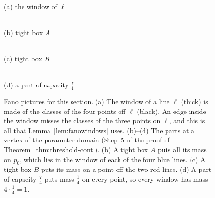 \documentclass[11pt]{amsart}
\theoremstyle{definition}
\theoremstyle{remark}
\newcommand{\fanopts}{%
  \coordinate (P1) at (0,0); \coordinate (P2) at (4,0); \coordinate (P3) at (2,3.464);
  \coordinate (P4) at (2,0); \coordinate (P5) at (3,1.732); \coordinate (P6) at (1,1.732); \coordinate (P7) at (2,1.155);}
\newcommand{\fanolines}[1]{%
  \draw[#1] (P1)--(P2)--(P3)--cycle; \draw[#1] (P1)--(P5); \draw[#1] (P2)--(P6); \draw[#1] (P3)--(P4); \draw[#1] (P7) circle (1.155);}
\begin{document}
\begin{figure}[htb]
\centering
\begin{minipage}{0.24\textwidth}\centering
{}\\[2pt]{\footnotesize (a) the window of $\ell$}
\end{minipage}\hfill
\begin{minipage}{0.24\textwidth}\centering
{}\\[2pt]{\footnotesize (b) tight box $A$}
\end{minipage}\hfill
\begin{minipage}{0.24\textwidth}\centering
{}\\[2pt]{\footnotesize (c) tight box $B$}
\end{minipage}\hfill
\begin{minipage}{0.24\textwidth}\centering
{}\\[2pt]{\footnotesize (d) a part of capacity $\frac74$}
\end{minipage}
\caption{Fano pictures for this section. (a) The window of a line $\ell$ (thick) is made of the classes of the four points off $\ell$ (black). An edge inside the window misses the classes of the three points on $\ell$, and this is all that Lemma~\ref{lem:fanowindows} uses. (b)--(d) The parts at a vertex of the parameter domain (Step~5 of the proof of Theorem~\ref{thm:threshold-cont}). (b) A tight box $A$ puts all its mass on $p_0$, which lies in the window of each of the four blue lines. (c) A tight box $B$ puts its mass on a point off the two red lines. (d) A part of capacity $\frac74$ puts mass $\frac14$ on every point, so every window has mass $4\cdot\frac14=1$.}\label{fig:fanopics}
\end{figure}
\end{document}
